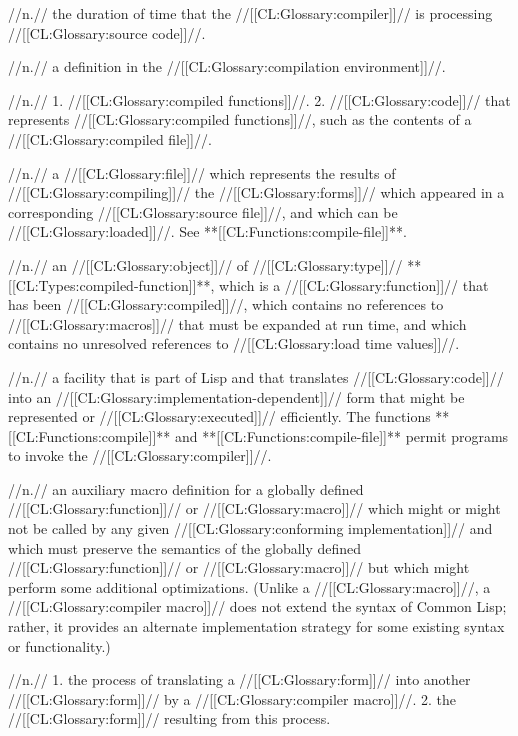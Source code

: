  //n.// the duration of time that the //[[CL:Glossary:compiler]]// is processing //[[CL:Glossary:source code]]//.

 //n.// a definition in the //[[CL:Glossary:compilation environment]]//.

 //n.// 1. //[[CL:Glossary:compiled functions]]//. 2. //[[CL:Glossary:code]]// that represents //[[CL:Glossary:compiled functions]]//, such as the contents of a //[[CL:Glossary:compiled file]]//.

 //n.// a //[[CL:Glossary:file]]// which represents the results of //[[CL:Glossary:compiling]]// the //[[CL:Glossary:forms]]// which appeared in a corresponding //[[CL:Glossary:source file]]//, and which can be //[[CL:Glossary:loaded]]//. See **[[CL:Functions:compile-file]]**.

 //n.// an //[[CL:Glossary:object]]// of //[[CL:Glossary:type]]// **[[CL:Types:compiled-function]]**, which is a //[[CL:Glossary:function]]// that has been //[[CL:Glossary:compiled]]//, which contains no references to //[[CL:Glossary:macros]]// that must be expanded at run time, and which contains no unresolved references to //[[CL:Glossary:load time values]]//.

 //n.// a facility that is part of Lisp and that translates //[[CL:Glossary:code]]// into an //[[CL:Glossary:implementation-dependent]]// form that might be represented or //[[CL:Glossary:executed]]// efficiently. The functions **[[CL:Functions:compile]]** and **[[CL:Functions:compile-file]]** permit programs to invoke the //[[CL:Glossary:compiler]]//.

 //n.// an auxiliary macro definition for a globally defined //[[CL:Glossary:function]]// or //[[CL:Glossary:macro]]// which might or might not be called by any given //[[CL:Glossary:conforming implementation]]// and which must preserve the semantics of the globally defined //[[CL:Glossary:function]]// or //[[CL:Glossary:macro]]// but which might perform some additional optimizations. (Unlike a //[[CL:Glossary:macro]]//, a //[[CL:Glossary:compiler macro]]// does not extend the syntax of Common Lisp; rather, it provides an alternate implementation strategy for some existing syntax or functionality.)

 //n.// 1. the process of translating a //[[CL:Glossary:form]]// into another //[[CL:Glossary:form]]// by a //[[CL:Glossary:compiler macro]]//. 2. the //[[CL:Glossary:form]]// resulting from this process.

